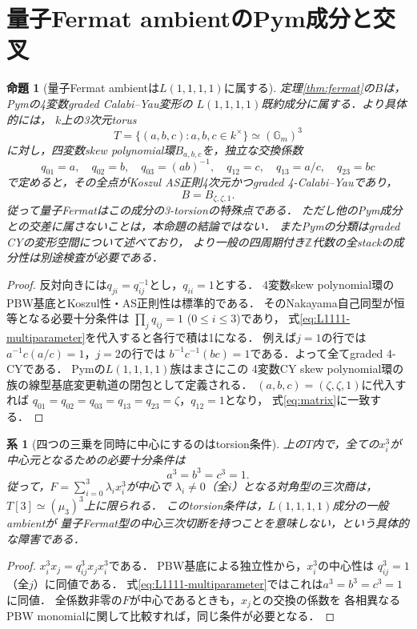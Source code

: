 \documentclass[11pt,a4paper]{ltjsarticle}
\newtheorem{proposition}[theorem]{命題}
\newtheorem{corollary}[theorem]{系}
\theoremstyle{definition}\newtheorem{definition}[theorem]{定義}
\begin{document}
\section{量子Fermat ambientのPym成分と交叉}
\label{sec:fermat-Pym-L}
\begin{proposition}[量子Fermat ambientは$L(1,1,1,1)$に属する]
\label{prop:fermat-in-L1111}
定理\ref{thm:fermat}の$B$は，Pymの4変数graded Calabi--Yau変形の
$L(1,1,1,1)$既約成分に属する．より具体的には，
$k$上の3次元torus
\[
 T=\{(a,b,c):a,b,c\in k^\times\}\simeq(\mathbb G_m)^3
\]
に対し，四変数skew polynomial環$B_{a,b,c}$を，独立な交換係数
\begin{equation}\label{eq:L1111-multiparameter}
 q_{01}=a,\quad q_{02}=b,\quad q_{03}=(ab)^{-1},\quad
 q_{12}=c,\quad q_{13}=a/c,\quad q_{23}=bc
\end{equation}
で定めると，その全点がKoszul AS正則4次元かつgraded 4-Calabi--Yauであり，
\[
 B=B_{\zeta,\zeta,1}.
\]
従って量子Fermatはこの成分の\emph{3-torsionの特殊点}である．
ただし他のPym成分との交差に属さないことは，本命題の結論ではない．
またPymの分類はgraded CYの変形空間について述べており，
より一般の四周期付き$\mathbb Z$代数の全stackの成分性は別途検査が必要である．
\end{proposition}
\begin{proof}
反対向きには$q_{ji}=q_{ij}^{-1}$とし，$q_{ii}=1$とする．
4変数skew polynomial環のPBW基底とKoszul性・AS正則性は標準的である．
そのNakayama自己同型が恒等となる必要十分条件は
$\prod_jq_{ij}=1$ ($0\le i\le3$)であり，
式\eqref{eq:L1111-multiparameter}を代入すると各行で積は1になる．
例えば$j=1$の行では$a^{-1}c(a/c)=1$，$j=2$の行では
$b^{-1}c^{-1}(bc)=1$である．よって全てgraded 4-CYである．
Pym\cite[Theorem 1.1, \S3.1]{Pym}の$L(1,1,1,1)$族はまさにこの
4変数CY skew polynomial環の族の線型基底変更軌道の閉包として定義される．
$(a,b,c)=(\zeta,\zeta,1)$に代入すれば
$q_{01}=q_{02}=q_{03}=q_{13}=q_{23}=\zeta$，$q_{12}=1$となり，
式\eqref{eq:matrix}に一致する．
\end{proof}

\begin{corollary}[四つの三乗を同時に中心にするのはtorsion条件]
\label{cor:central-Fermat-torsion}
上の$T$内で，全ての$x_i^3$が中心元となるための必要十分条件は
\[
 a^3=b^3=c^3=1.
\]
従って，$F=\sum_{i=0}^3\lambda_i x_i^3$が中心で
$\lambda_i\ne0$（全$i$）となる対角型の三次商は，
$T[3]\simeq(\mu_3)^3$上に限られる．
このtorsion条件は，$L(1,1,1,1)$成分の一般ambientが
量子Fermat型の中心三次切断を持つことを意味しない，という具体的な障害である．
\end{corollary}
\begin{proof}
$x_i^3x_j=q_{ij}^3x_jx_i^3$である．
PBW基底による独立性から，$x_i^3$の中心性は
$q_{ij}^3=1$（全$j$）に同値である．
式\eqref{eq:L1111-multiparameter}ではこれは$a^3=b^3=c^3=1$に同値．
全係数非零の$F$が中心であるときも，$x_j$との交換の係数を
各相異なるPBW monomialに関して比較すれば，同じ条件が必要となる．
\end{proof}
\end{document}
